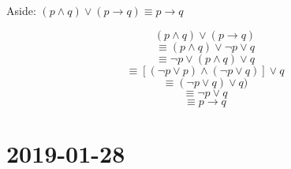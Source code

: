 \documentclass{article}
\theoremstyle{definition}
\begin{document}
Aside: $(p \land q) \lor (p \rightarrow q) \equiv p \rightarrow q$

$$(p \land q) \lor (p \rightarrow q)$$
$$\equiv (p \land q) \lor \neg p \lor q$$
$$\equiv \neg p \lor (p \land q) \lor q$$
$$\equiv [(\neg p \lor p) \land (\neg p \lor q)] \lor q$$
$$\equiv (\neg p \lor q) \lor q)$$
$$\equiv \neg p \lor q$$
$$\equiv p \rightarrow q$$

\section*{2019-01-28}

\subsection*{}
\end{document}
